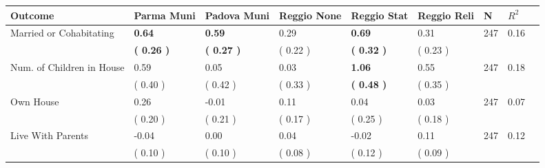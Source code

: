 \begin{tabular}{L{6.2cm} C{1.8cm} C{1.8cm} C{1.8cm} C{1.8cm} C{1.8cm} C{1.8cm} C{0.3cm} C{0.3cm}}
\toprule
 \textbf{Outcome} & \textbf{Parma Muni} & \textbf{Padova Muni} & \textbf{Reggio None} & \textbf{Reggio Stat} & \textbf{Reggio Reli} & \textbf{N} & \textbf{$ R^2$} \\
\midrule
Married or Cohabitating & \textbf{     0.64} & \textbf{     0.59} &      0.29 & \textbf{     0.69} &      0.31  & 247 &       0.16 \\ 
 & \textbf{(     0.26 )} & \textbf{(     0.27 )} & (     0.22 ) & \textbf{(     0.32 )} & (     0.23 )  & \\
Num. of Children in House &      0.59 &      0.05 &      0.03 & \textbf{     1.06} &      0.55  & 247 &       0.18 \\ 
 & (     0.40 ) & (     0.42 ) & (     0.33 ) & \textbf{(     0.48 )} & (     0.35 )  & \\
Own House &      0.26 &     -0.01 &      0.11 &      0.04 &      0.03  & 247 &       0.07 \\ 
 & (     0.20 ) & (     0.21 ) & (     0.17 ) & (     0.25 ) & (     0.18 )  & \\
Live With Parents &     -0.04 &      0.00 &      0.04 &     -0.02 &      0.11  & 247 &       0.12 \\ 
 & (     0.10 ) & (     0.10 ) & (     0.08 ) & (     0.12 ) & (     0.09 )  & \\
\bottomrule
\end{tabular}
